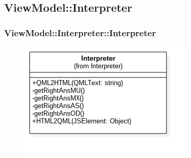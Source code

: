 \subsection{ViewModel::Interpreter}
\subsubsection{ViewModel::Interpreter::Interpreter}
\begin{figure}[h!]
\begin{center}
	\includegraphics[scale=0.4]{../images/ViewModel/Interpreter/Interpreter.png}
\end{center}
\end{figure}
